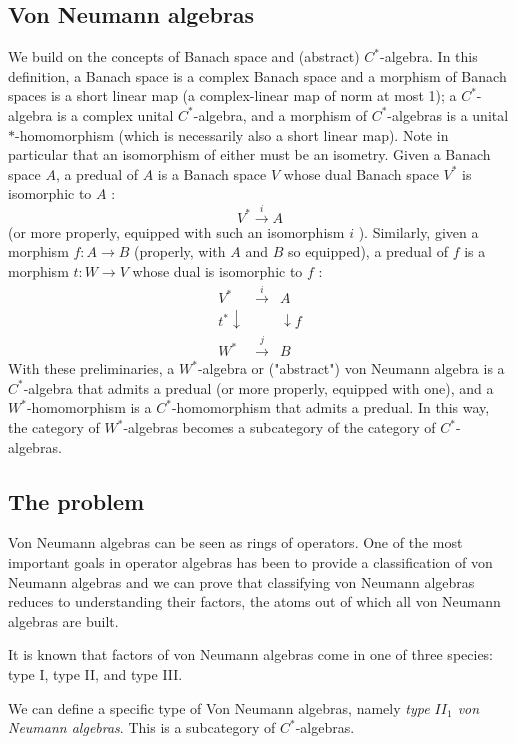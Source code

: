 
\subsection{Von Neumann algebras}
We build on the concepts of Banach space and (abstract) $C^{*}$-algebra. In this definition, a Banach space is a complex Banach space and a morphism of Banach spaces is a short linear map (a complex-linear map of norm at most 1); a $C^{*}$-algebra is a complex unital $C^{*}$-algebra, and a morphism of $C^{*}$-algebras is a unital $*$-homomorphism (which is necessarily also a short linear map). Note in particular that an isomorphism of either must be an isometry.
Given a Banach space $A$, a predual of $A$ is a Banach space $V$ whose dual Banach space $V^{*}$ is isomorphic to $A$ :
$$
V^{*} \stackrel{i}{\rightarrow} A
$$
(or more properly, equipped with such an isomorphism $i$ ). Similarly, given a morphism $f: A \rightarrow B$ (properly, with $A$ and $B$ so equipped), a predual of $f$ is a morphism $t: W \rightarrow V$ whose dual is isomorphic to $f$ :
$$
\begin{array}{ccc}
V^{*} & \stackrel{i}{\rightarrow} & A \\
t^{*} \downarrow & & \downarrow f \\
W^{*} & \stackrel{j}\rightarrow & B
\end{array}
$$
With these preliminaries, a $W^{*}$-algebra or ("abstract") von Neumann algebra is a $C^{*}$-algebra that admits a predual (or more properly, equipped with one), and a $W^{*}$-homomorphism is a $C^{*}$-homomorphism that admits a predual. In this way, the category of $W^{*}$-algebras becomes a subcategory of the category of $C^{*}$-algebras.


\subsection{The problem}

Von Neumann algebras can be seen as rings of operators. One of the most important goals in operator algebras has been to provide a classification of von Neumann algebras and we can prove that classifying von Neumann algebras reduces to understanding their factors, the atoms out of which all von Neumann algebras are built.

It is known that factors of von Neumann algebras come in one of three species: type I, type II, and type III. 

We can define a specific type of Von Neumann algebras, namely \emph{type $II_1$ von Neumann algebras}. This is a subcategory of $C^{*}$-algebras.

